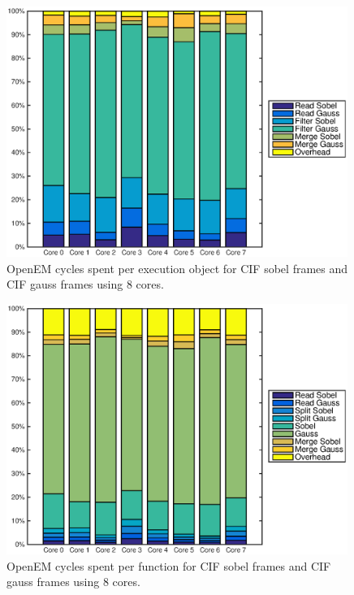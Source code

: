 \begin{figure}[h!]
    \begin{center}
        \includegraphics[width=0.99\textwidth]{images/openem_cifcif_8cores_eo.eps}
        \caption{OpenEM cycles spent per execution object for CIF sobel frames and CIF gauss frames using 8 cores.}
        \label{fig:oem8coreeo2}
    \end{center}
\end{figure}

\begin{figure}[h!]
    \begin{center}
        \includegraphics[width=0.99\textwidth]{images/openem_cifcif_8cores_func.eps}
        \caption{OpenEM cycles spent per function for CIF sobel frames and CIF gauss frames using 8 cores.}
        \label{fig:oem8corefunc2}
    \end{center}
\end{figure}
